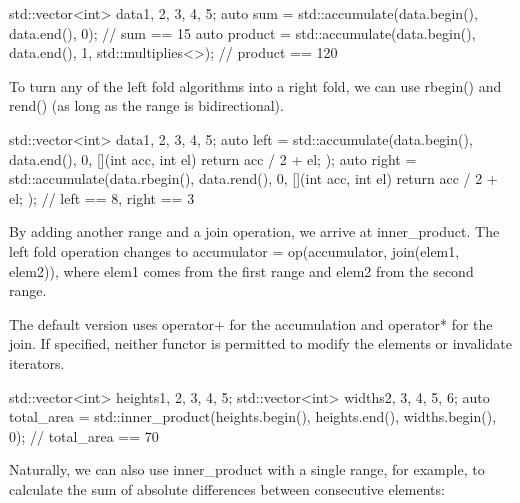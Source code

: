 \begin{box-note}
\begin{cppcode}
std::vector<int> data{1, 2, 3, 4, 5};
auto sum = std::accumulate(data.begin(), data.end(), 0);
// sum == 15
auto product = std::accumulate(data.begin(), data.end(), 1, std::multiplies<>{});
// product == 120
\end{cppcode}
\end{box-note}

To turn any of the left fold algorithms into a right fold, we can use rbegin() and rend() (as long as the range is bidirectional).

\begin{box-note}
\begin{cppcode}
std::vector<int> data{1, 2, 3, 4, 5};
auto left = std::accumulate(data.begin(), data.end(), 0, [](int acc, int el) {
    return acc / 2 + el;
});
auto right = std::accumulate(data.rbegin(), data.rend(), 0, [](int acc, int el) {
    return acc / 2 + el;
});
// left == 8, right == 3
\end{cppcode}
\end{box-note}

By adding another range and a join operation, we arrive at inner\_product. The left fold operation changes to accumulator = op(accumulator, join(elem1, elem2)), where elem1 comes from the first range and elem2 from the second range.



The default version uses operator+ for the accumulation and operator* for the join. If specified, neither functor is permitted to modify the elements or invalidate iterators.

\begin{box-note}
\begin{cppcode}
std::vector<int> heights{1, 2, 3, 4, 5};
std::vector<int> widths{2, 3, 4, 5, 6};
auto total_area = std::inner_product(heights.begin(), heights.end(), widths.begin(), 0);
// total_area == 70
\end{cppcode}
\end{box-note}

Naturally, we can also use inner\_product with a single range, for example, to calculate the sum of absolute differences between consecutive elements:


